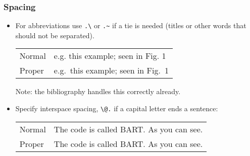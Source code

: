 \documentclass[10pt, letter]{article}
\begin{document}
\subsubsection*{Spacing}
\begin{itemize}
\item For abbreviations use \verb|.\| or \verb|.~| if a tie is needed
  (titles or other words that should not be separated).
  \begin{center}
    \begin{tabular}[h!]{ll}
      Normal & e.g. this example; seen in Fig. 1 \\
      Proper & e.g.\ this example; seen in Fig.~1
    \end{tabular}
  \end{center}
  Note: the bibliography handles this correctly already.
\item Specify interspace spacing, \verb|\@.| if a capital letter ends
  a sentence:
    \begin{center}
    \begin{tabular}[h!]{ll} 
      Normal & The code is called BART. As you can see. \\
      Proper & The code is called BART\@. As you can see.
    \end{tabular}
  \end{center}
\end{itemize}  
\end{document}
